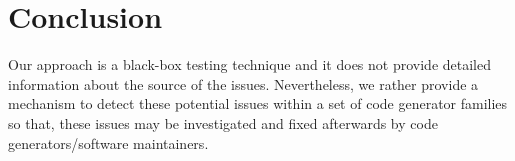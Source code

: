 







\section{Conclusion}
\label{sec:cg-conclusion}
Our approach is a black-box testing technique and it does not provide detailed information about the source of the issues. Nevertheless, we rather provide a mechanism to detect these potential issues within a set of code generator families so that, these issues may be investigated and fixed afterwards by code generators/software maintainers. 



